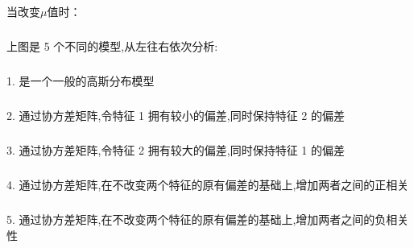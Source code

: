 \documentclass{article}
\begin{document}
\begin{CJK}{UTF8}{gbsn}
\begin{figure}[H]
\label{fig:964}
\end{figure}
\begin{figure}[H]
\label{fig:965}
\end{figure}
\subparagraph{}
当改变$\mu$值时：
\begin{figure}[H]
\label{fig:966}
\end{figure}
\subparagraph{}
上图是 5 个不同的模型,从左往右依次分析:
\begin{figure}[H]
\label{fig:967}
\end{figure}
\subparagraph{}
1. 是一个一般的高斯分布模型
\subparagraph{}
2. 通过协方差矩阵,令特征 1 拥有较小的偏差,同时保持特征 2 的偏差
\subparagraph{}
3. 通过协方差矩阵,令特征 2 拥有较大的偏差,同时保持特征 1 的偏差
\subparagraph{}
4. 通过协方差矩阵,在不改变两个特征的原有偏差的基础上,增加两者之间的正相关
\subparagraph{}
5. 通过协方差矩阵,在不改变两个特征的原有偏差的基础上,增加两者之间的负相关性
\begin{figure}[H]
\label{fig:967}
\end{figure}
\begin{figure}[H]
\label{fig:967}
\end{figure}

\end{CJK}
\end{document}
